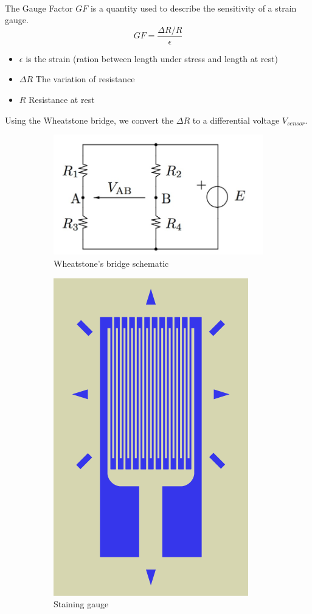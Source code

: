 \documentclass{article}[12pt]
\begin{document}
\paragraph{}
The Gauge Factor $GF$ is a quantity used to describe the sensitivity of a strain gauge. \cite{bucci}
\begin{equation}
GF=\dfrac{\Delta R/R}{\epsilon}
\end{equation}
\begin{itemize}
\item $\epsilon$ is the strain (ration between length under stress and length at rest)
\item $\Delta R$ The variation of resistance
\item $R$ Resistance at rest
\end{itemize}
Using the Wheatstone bridge, we convert the $\Delta R$ to a differential voltage $V_{sensor}$.
\begin{figure}[H]
\centering
\begin{subfigure}{.5\textwidth}
  \centering
  \includegraphics[width=.8\linewidth]{figures/wheatstone.jpg}
  \caption{Wheatstone's bridge schematic}
  \label{fig:Wheatstone}
\end{subfigure}%
\begin{subfigure}{.5\textwidth}
  \centering
  \includegraphics[width=.4\linewidth]{figures/Strain_gauge.png}
  \caption{Staining gauge \cite{LeBerre-2016}}
  \label{fig:sub2}
\end{subfigure}
\caption{}
\label{fig:test}
\end{figure}
\end{document}
